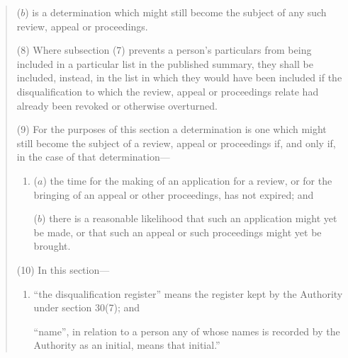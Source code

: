 \documentclass[12pt,a4paper]{article}
\begin{document}
\begin{quotation}
\begin{enumerate}
($b$) is a determination which might still become the subject of any such review, appeal or proceedings.
\end{enumerate}

(8) Where subsection (7)  prevents a person’s particulars from being included in a particular list in the published summary, they shall be included, instead, in the list in which they would have been included if the disqualification to which the review, appeal or proceedings relate had already been revoked or otherwise overturned.

(9) For the purposes of this section a determination is one which might still become the subject of a review, appeal or proceedings if, and only if, in the case of that determination—
\begin{enumerate}\item[]
($a$) the time for the making of an application for a review, or for the bringing of an appeal or other proceedings, has not expired; and

($b$) there is a reasonable likelihood that such an application might yet be made, or that such an appeal or such proceedings might yet be brought.
\end{enumerate}

(10) In this section—
\begin{enumerate}\item[]
    “the disqualification register” means the register kept by the Authority under section 30(7); and

    “name”, in relation to a person any of whose names is recorded by the Authority as an initial, means that initial.” 
\end{enumerate}
\end{quotation}
\end{document}
